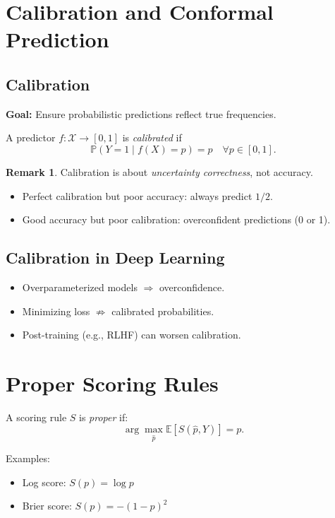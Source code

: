 \documentclass[12pt,oneside]{book}
\numberwithin{equation}{section}
\theoremstyle{definition}
\newtheorem{remark}{Remark}[section]
\theoremstyle{plain}
\theoremstyle{remark}
\begin{document}
\section{Calibration and Conformal Prediction}

\subsection{Calibration}

\textbf{Goal:} Ensure probabilistic predictions reflect true frequencies.

A predictor $f:\mathcal{X} \to [0,1]$ is \textit{calibrated} if
\[
\mathbb{P}(Y=1 \mid f(X)=p) = p \quad \forall p \in [0,1].
\]

\begin{remark}
Calibration is about \textit{uncertainty correctness}, not accuracy.
\end{remark}

\begin{itemize}
    \item Perfect calibration but poor accuracy: always predict $1/2$.
    \item Good accuracy but poor calibration: overconfident predictions (0 or 1).
\end{itemize}

\subsection{Calibration in Deep Learning}

\begin{itemize}
    \item Overparameterized models $\Rightarrow$ overconfidence.
    \item Minimizing loss $\not\Rightarrow$ calibrated probabilities.
    \item Post-training (e.g., RLHF) can worsen calibration.
\end{itemize}

\section{Proper Scoring Rules}

A scoring rule $S$ is \textit{proper} if:
\[
\arg\max_{\hat p} \mathbb{E}[S(\hat p, Y)] = p.
\]

Examples:
\begin{itemize}
    \item Log score: $S(p)=\log p$
    \item Brier score: $S(p)=-(1-p)^2$
\end{itemize}
\end{document}
